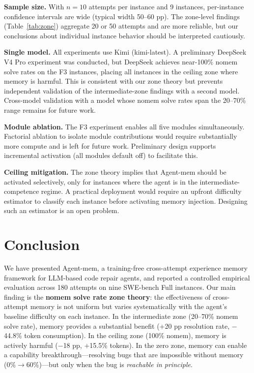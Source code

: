 \documentclass{article}
\begin{document}
\textbf{Sample size.} With $n=10$ attempts per instance and 9 instances, per-instance confidence intervals are wide (typical width 50--60 pp). The zone-level findings (Table~\ref{tab:zone}) aggregate 20 or 50 attempts and are more reliable, but our conclusions about individual instance behavior should be interpreted cautiously.

\textbf{Single model.} All experiments use Kimi (kimi-latest). A preliminary DeepSeek V4 Pro experiment was conducted, but DeepSeek achieves near-100\% nomem solve rates on the F3 instances, placing all instances in the ceiling zone where memory is harmful. This is consistent with our zone theory but prevents independent validation of the intermediate-zone findings with a second model. Cross-model validation with a model whose nomem solve rates span the 20--70\% range remains for future work.

\textbf{Module ablation.} The F3 experiment enables all five modules simultaneously. Factorial ablation to isolate module contributions would require substantially more compute and is left for future work. Preliminary design supports incremental activation (all modules default off) to facilitate this.

\textbf{Ceiling mitigation.} The zone theory implies that Agent-mem should be activated selectively, only for instances where the agent is in the intermediate-competence regime. A practical deployment would require an upfront difficulty estimator to classify each instance before activating memory injection. Designing such an estimator is an open problem.

\section{Conclusion}

We have presented Agent-mem, a training-free cross-attempt experience memory framework for LLM-based code repair agents, and reported a controlled empirical evaluation across 180 attempts on nine SWE-bench Full instances. Our main finding is the \textbf{nomem solve rate zone theory}: the effectiveness of cross-attempt memory is not uniform but varies systematically with the agent's baseline difficulty on each instance. In the intermediate zone (20--70\% nomem solve rate), memory provides a substantial benefit ($+$20 pp resolution rate, $-$44.8\% token consumption). In the ceiling zone (100\% nomem), memory is actively harmful ($-$18 pp, $+$15.5\% tokens). In the zero zone, memory can enable a capability breakthrough---resolving bugs that are impossible without memory (0\%$\to$60\%)---but only when the bug is \emph{reachable in principle}.
\end{document}
